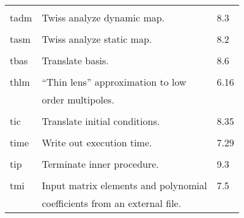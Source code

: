 \begin{center}
\begin{tabular}{lll}
\vspace{-3mm}& &\\
\hspace{1.5em}tadm    &  Twiss analyze dynamic map.     &  \hspace{2em}8.3\\
\vspace{-3mm}& &\\
\hspace{1.5em}tasm    &  Twiss analyze static map.      &  \hspace{2em}8.2\\
\vspace{-3mm}& &\\
\hspace{1.5em}tbas    &   Translate basis.               &  \hspace{2em}8.6\\
\vspace{-3mm}& &\\
\hspace{1.5em}thlm  &   ``Thin lens'' approximation to low    &\hspace{2em}6.16\\
               &         order multipoles.                    &      \\
\vspace{-3mm}& &\\
\hspace{1.5em}tic     &  Translate initial conditions.     &  \hspace{2em}8.35\\
\vspace{-3mm}& &\\
\hspace{1.5em}time  &     Write out execution time.        & \hspace{2em}7.29\\
\vspace{-3mm}& &\\
\hspace{1.5em}tip    &  Terminate inner procedure.        &     \hspace{2em}9.3\\
\vspace{-3mm}& &\\
\hspace{1.5em}tmi   &   Input matrix elements and polynomial  & \hspace{2em}7.5\\
                    & coefficients from an external file.          &\\

\end{tabular}
\end{center}
